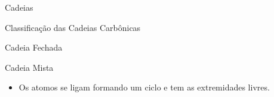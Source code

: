 \documentclass{beamer}
\begin{document}
\begin{frame}[label={sec:orgb730017}]{Cadeias}
\begin{block}{Classificação das Cadeias Carbônicas}
\begin{myrule}{Cadeia Fechada}
\begin{center}
\end{center}

\end{myrule}


\begin{myrule}{Cadeia Mista}

\begin{itemize}
\item Os atomos se ligam formando um ciclo e tem as extremidades livres.
\end{itemize}
\begin{center}
\end{center}

\end{myrule}
\end{block}
\end{frame}
\end{document}
